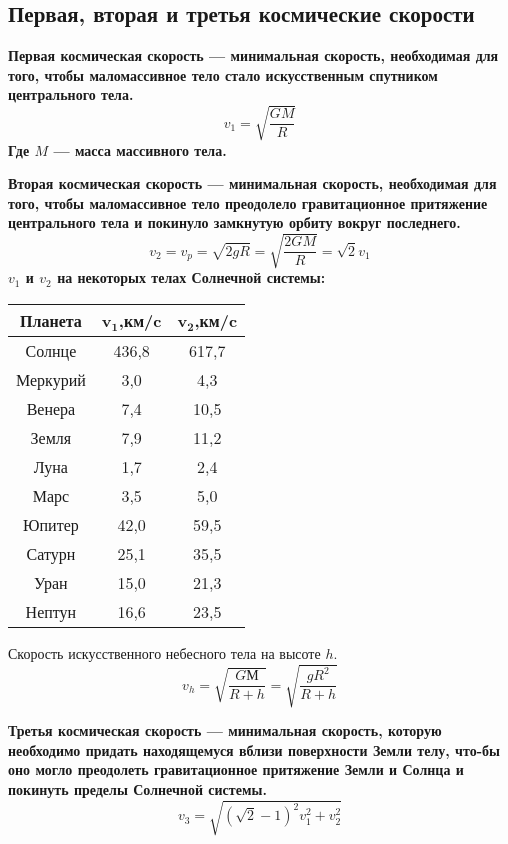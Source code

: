 \subsection{Первая, вторая и третья космические скорости} 

\bfseries Первая космическая скорость \mdseries --- минимальная скорость, необходимая для того, чтобы маломассивное тело стало искусственным спутником центрального тела.
$$v_1=\sqrt{\frac{GM}{R}}$$
Где $M$ --- масса массивного тела.

\bfseries Вторая космическая скорость \mdseries --- минимальная скорость, необходимая для того, чтобы маломассивное тело преодолело гравитационное притяжение центрального тела и покинуло замкнутую орбиту вокруг последнего. 
$$v_2=v_p=\sqrt{2gR}=\sqrt{\frac{2GM}{R}}=\sqrt{2}v_1$$
$v_1$ и $v_2$ на некоторых телах Солнечной системы:
\begin{table}[h!]
\centering
\begin{tabular}{|c|c|c|}
\hline
\textbf{Планета} & $\mathbf{v_1}$,\textbf{км/c} & $\mathbf{v_2}$,\textbf{км/c}\\
\hline
Солнце & 436,8 & 617,7\\
\hline
Меркурий & 3,0 & 4,3\\
\hline
Венера & 7,4 & 10,5\\
\hline
Земля & 7,9 & 11,2\\
\hline
Луна & 1,7 & 2,4\\
\hline
Марс & 3,5 & 5,0\\
\hline
Юпитер & 42,0 & 59,5\\
\hline
Сатурн & 25,1 & 35,5\\
\hline
Уран & 15,0 & 21,3\\
\hline
Нептун & 16,6 & 23,5\\
\hline
\end{tabular}
\end{table}

Скорость искусственного небесного тела на высоте $h$.$$v_h=\sqrt{\frac{GМ}{R+h}}=\sqrt{\frac{gR^2}{R+h}}$$

\bfseries Третья космическая скорость \mdseries --- минимальная скорость, которую необходимо придать находящемуся вблизи поверхности Земли телу, что-бы оно могло преодолеть гравитационное притяжение Земли и Солнца и покинуть пределы Солнечной системы.
$$v_3=\sqrt{(\sqrt{2}-1)^2v^2_1+v^2_2}$$ 